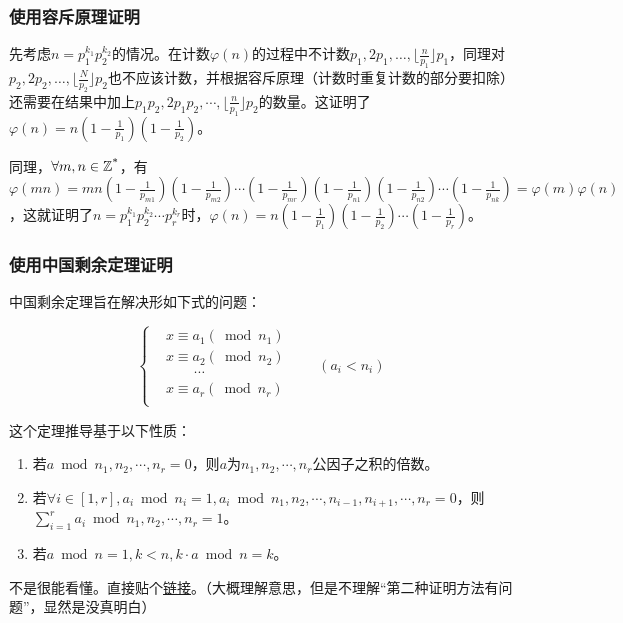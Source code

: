 \documentclass[a4paper]{article}  %
\begin{document}
\begin{sloppypar}
\subsubsection{使用容斥原理证明}

先考虑$n = p_{1}^{k_1}p_{2}^{k_2}$的情况。在计数$\varphi(n)$的过程中不计数$p_1, 2p_1, \ldots, \lfloor \frac{n}{p_1} \rfloor p_1$，同理对$p_2, 2p_2, \ldots, \lfloor \frac{N}{p_2} \rfloor p_2$也不应该计数，并根据容斥原理（计数时重复计数的部分要扣除）还需要在结果中加上$p_1p_2, 2p_1p_2, \cdots, \lfloor \frac{n}{p_1} \rfloor p_2$的数量。这证明了$\varphi(n)=n(1-\frac{1}{p_1})(1-\frac{1}{p_2})$。

同理，$\forall m, n \in \mathbb{Z\textsuperscript{*}}$，有$\varphi(mn)=mn(1-\frac{1}{p_{m1}})(1-\frac{1}{p_{m2}}) \cdots (1-\frac{1}{p_{mr}})(1-\frac{1}{p_{n1}})(1-\frac{1}{p_{n2}}) \cdots (1-\frac{1}{p_{nk}})=\varphi(m)\varphi(n)$，这就证明了$n = p_{1}^{k_1}p_{2}^{k_2}\cdots p_{r}^{k_r}$时，$\varphi(n)=n(1-\frac{1}{p_1})(1-\frac{1}{p_2})\cdots (1-\frac{1}{p_r})$。

\subsubsection{使用中国剩余定理证明}

中国剩余定理旨在解决形如下式的问题：

\[
	\left\{
	\begin{aligned}
		 & x \equiv a_1(\bmod n_1)\\
		 & x \equiv a_2(\bmod n_2)\\
		 & \qquad \cdots\\
		 & x \equiv a_r(\bmod n_r)\\
	\end{aligned}
	\right. \qquad(a_i < n_i)
\]

这个定理推导基于以下性质：

\begin{enumerate}
	\item 若$a \bmod n_1,n_2, \cdots, n_r = 0$，则$a$为$n_1,n_2, \cdots, n_r$公因子之积的倍数。
	\item 若$\forall i \in [1, r], a_i \bmod n_i = 1, a_i \bmod n_1,n_2,\cdots,n_{i-1}, n_{i+1},\cdots, n_r = 0$，则$\sum \limits_{i=1}^{r} a_i \bmod n_1,n_2, \cdots , n_r = 1$。
	\item 若$a \bmod n = 1, k < n, k \cdot a \bmod n = k$。
\end{enumerate}


不是很能看懂。直接贴个\href{https://zhuanlan.zhihu.com/p/600282116}{链接}。（大概理解意思，但是不理解“第二种证明方法有问题”，显然是没真明白）


\end{sloppypar}
\end{document}
